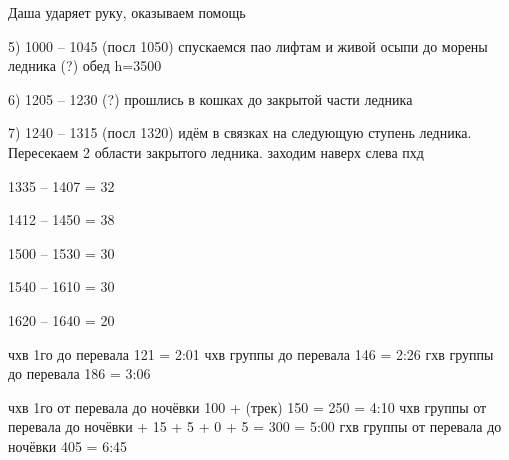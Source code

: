 Даша ударяет руку, оказываем помощь

5) 1000 -- 1045 (посл 1050) спускаемся пао лифтам и живой осыпи до морены ледника (?) обед h=3500

6) 1205 -- 1230 (?) прошлись в кошках до закрытой части ледника

7) 1240 -- 1315 (посл 1320) идём в связках на следующую ступень ледника. Пересекаем 2 области закрытого ледника. заходим наверх слева пхд

1335 -- 1407 = 32

1412 -- 1450 = 38

1500 -- 1530 = 30

1540 -- 1610 = 30

1620 -- 1640 = 20


чхв 1го до перевала 121 = 2:01
чхв группы до перевала 146 = 2:26
гхв группы до перевала 186 = 3:06


чхв 1го от перевала до ночёвки 100 + (трек) 150 = 250 = 4:10
чхв группы от перевала до ночёвки + 15 + 5 + 0 + 5 = 300 = 5:00
гхв группы от перевала до ночёвки 405 = 6:45



    \FloatBarrier

